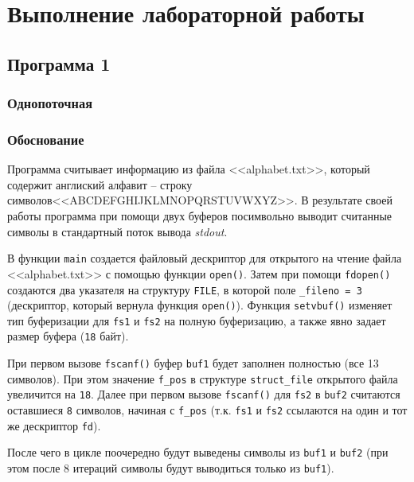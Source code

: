 \chapter{Выполнение лабораторной работы}

\section{Программа 1}

\subsection{Однопоточная}

\begin{center}
    \captionsetup{justification=raggedright,singlelinecheck=off}
    
\end{center}


\subsection{Обоснование}

Программа считывает информацию из файла <<alphabet.txt>>, который содержит англиский алфавит -- строку символов\linebreak <<ABCDEFGHIJKLMNOPQRSTUVWXYZ>>. В результате своей работы программа  при помощи двух буферов посимвольно выводит считанные символы в стандартный поток вывода \textit{stdout}.

В функции \texttt{main} создается файловый дескриптор для открытого на чтение файла <<alphabet.txt>> с помощью функции \texttt{open()}. Затем при помощи \texttt{fdopen()} создаются два указателя на структуру \texttt{FILE}, в которой поле \texttt{\_fileno = 3} (дескриптор, который вернула функция \texttt{open()}).
Функция \texttt{setvbuf()} изменяет тип буферизации для \texttt{fs1} и \texttt{fs2} на полную буферизацию, а также явно задает размер буфера (\texttt{18} байт).

При первом вызове \texttt{fscanf()} буфер \texttt{buf1} будет заполнен полностью (все 13 символов). При этом значение \texttt{f\_pos} в структуре \texttt{struct\_file} открытого файла увеличится на \texttt{18}. Далее при первом вызове \texttt{fscanf()} для \texttt{fs2} в \texttt{buf2} считаются оставшиеся \texttt{8} символов, начиная с \texttt{f\_pos} (т.к. \texttt{fs1} и \texttt{fs2} ссылаются на один и тот же дескриптор \texttt{fd}).

После чего в цикле поочередно будут выведены символы из \texttt{buf1} и \texttt{buf2} (при этом после 8 итераций символы будут выводиться только из \texttt{buf1}).

